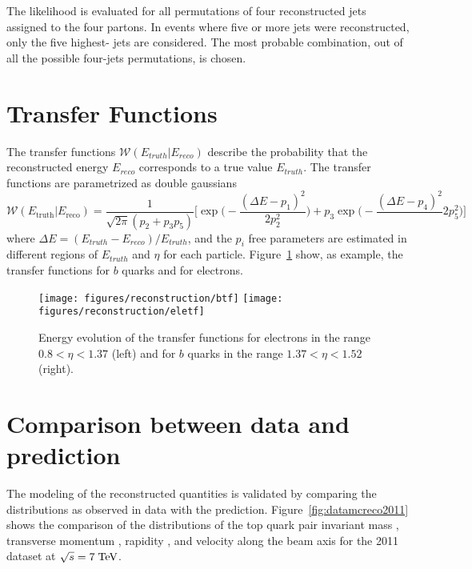 The likelihood is evaluated for all permutations of four reconstructed
jets assigned to the four partons.
In events where five or more jets were reconstructed, only
the five highest-\pt{} jets are considered. The most probable
combination, out of all the possible four-jets permutations, is
chosen. 

\section{Transfer Functions}
\label{sec:transferfunctions}

The transfer functions $\mathcal{W}(E_{truth}|E_{reco})$ describe the probability that the
reconstructed energy $E_{reco}$ corresponds to a true value
$E_{truth}$.
The transfer functions are parametrized as double gaussians
\begin{equation}
  \label{eq:doublegaus}
  \mathcal{W}(E_\mathrm{truth}|E_\mathrm{reco}) = \frac{1}{\sqrt{2\pi}(p_2+p_3p_5)}\Bigg[ \exp\Bigg(-\frac{(\Delta E - p_1)^2}{2p_2^2}\Bigg) + p_3\exp\Bigg(-\frac{(\Delta E - p_4)^2}\
  {2p_5^2}\Bigg) \Bigg]\phantom{,}
\end{equation}
where $\Delta E = (E_{truth}-E_{reco})/E_{truth}$, and the $p_i$
free parameters are estimated in different regions of $E_{truth}$ and
$\eta$ for each particle. Figure~\ref{fig:transferfunctions} show, as
example, the transfer functions for $b$ quarks and for electrons.  

\begin{figure}[!htb]\centering
  \texttt{[image: figures/reconstruction/btf]}
  \texttt{[image: figures/reconstruction/eletf]}
  \caption[Energy evolution of transfer functions]{
    Energy evolution of the transfer functions for electrons in the
    range $0.8<\eta<1.37$ (left) and for $b$ quarks in the range
    $1.37<\eta<1.52$ (right). 
    \label{fig:transferfunctions}
    }
\end{figure}

\section{Comparison between data and prediction}
\label{sec:datamcreco}

The modeling of the reconstructed quantities is validated by comparing
the distributions as observed in data with the prediction. 
Figure~\ref{fig:datamcreco2011} 
shows the comparison of the distributions of
the top quark pair invariant mass \mtt{}, transverse momentum \pttt{},
rapidity \ytt{}, and velocity along the beam axis \betatt{} for the
2011 dataset at $\sqrt{s} = 7 \; \mathrm{TeV}{}$.
                                   
